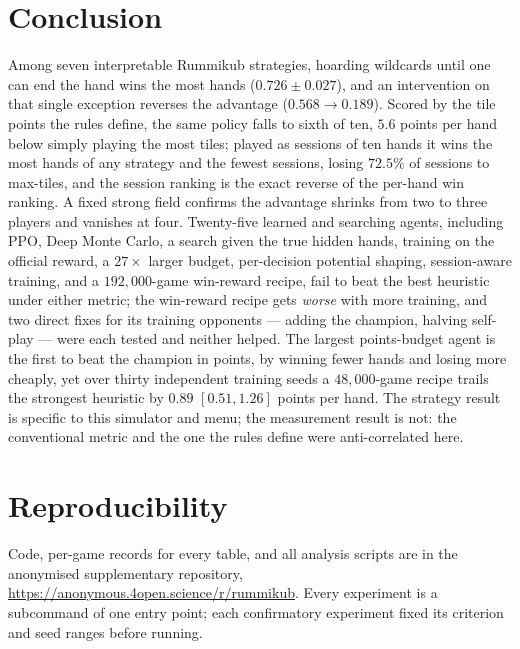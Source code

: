 \documentclass[10pt,journal,compsoc]{IEEEtran}
\newcommand{\repoanon}{\url{https://anonymous.4open.science/r/rummikub}}
\begin{document}
\section{Conclusion}
Among seven interpretable Rummikub strategies, hoarding wildcards until one can end the hand wins the most hands ($0.726\pm0.027$), and an intervention on that single exception reverses the advantage ($0.568\to0.189$). Scored by the tile points the rules define, the same policy falls to sixth of ten, $5.6$ points per hand below simply playing the most tiles; played as sessions of ten hands it wins the most hands of any strategy and the fewest sessions, losing $72.5\%$ of sessions to max-tiles, and the session ranking is the exact reverse of the per-hand win ranking. A fixed strong field confirms the advantage shrinks from two to three players and vanishes at four. Twenty-five learned and searching agents, including PPO, Deep Monte Carlo, a search given the true hidden hands, training on the official reward, a $27\times$ larger budget, per-decision potential shaping, session-aware training, and a $192{,}000$-game win-reward recipe, fail to beat the best heuristic under either metric; the win-reward recipe gets \emph{worse} with more training, and two direct fixes for its training opponents --- adding the champion, halving self-play --- were each tested and neither helped. The largest points-budget agent is the first to beat the champion in points, by winning fewer hands and losing more cheaply, yet over thirty independent training seeds a $48{,}000$-game recipe trails the strongest heuristic by $0.89$ $[0.51,1.26]$ points per hand. The strategy result is specific to this simulator and menu; the measurement result is not: the conventional metric and the one the rules define were anti-correlated here.

\section*{Reproducibility}
Code, per-game records for every table, and all analysis scripts are in the anonymised supplementary repository, \repoanon. Every experiment is a subcommand of one entry point; each confirmatory experiment fixed its criterion and seed ranges before running.
\end{document}

